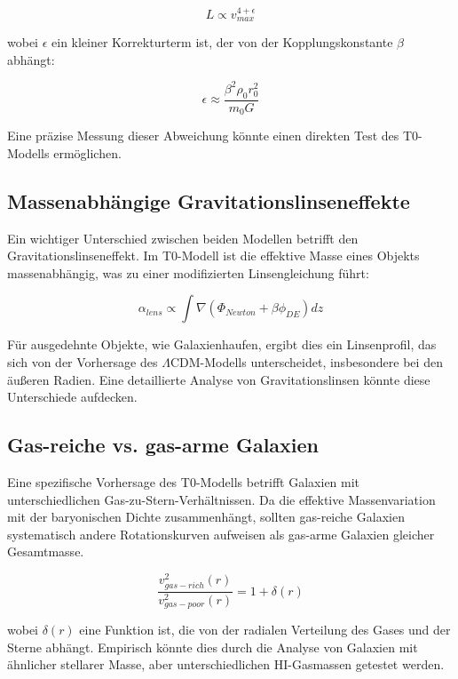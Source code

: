\documentclass[a4paper,12pt]{article}
\begin{document}
	\begin{equation}
		L \propto v_{max}^{4+\epsilon}
	\end{equation}
	
	wobei $\epsilon$ ein kleiner Korrekturterm ist, der von der Kopplungskonstante $\beta$ abhängt:
	
	\begin{equation}
		\epsilon \approx \frac{\beta^2 \rho_0 r_0^2}{m_0 G}
	\end{equation}
	
	Eine präzise Messung dieser Abweichung könnte einen direkten Test des T0-Modells ermöglichen.
	
	\subsection{Massenabhängige Gravitationslinseneffekte}
	
	Ein wichtiger Unterschied zwischen beiden Modellen betrifft den Gravitationslinseneffekt. Im T0-Modell ist die effektive Masse eines Objekts massenabhängig, was zu einer modifizierten Linsengleichung führt:
	
	\begin{equation}
		\alpha_{lens} \propto \int \nabla(\Phi_{Newton} + \beta\phi_{DE}) dz
	\end{equation}
	
	Für ausgedehnte Objekte, wie Galaxienhaufen, ergibt dies ein Linsenprofil, das sich von der Vorhersage des $\Lambda$CDM-Modells unterscheidet, insbesondere bei den äußeren Radien. Eine detaillierte Analyse von Gravitationslinsen könnte diese Unterschiede aufdecken.
	
	\subsection{Gas-reiche vs. gas-arme Galaxien}
	
	Eine spezifische Vorhersage des T0-Modells betrifft Galaxien mit unterschiedlichen Gas-zu-Stern-Verhältnissen. Da die effektive Massenvariation mit der baryonischen Dichte zusammenhängt, sollten gas-reiche Galaxien systematisch andere Rotationskurven aufweisen als gas-arme Galaxien gleicher Gesamtmasse.
	
	\begin{equation}
		\frac{v^2_{gas-rich}(r)}{v^2_{gas-poor}(r)} = 1 + \delta(r)
	\end{equation}
	
	wobei $\delta(r)$ eine Funktion ist, die von der radialen Verteilung des Gases und der Sterne abhängt. Empirisch könnte dies durch die Analyse von Galaxien mit ähnlicher stellarer Masse, aber unterschiedlichen HI-Gasmassen getestet werden.
	
\end{document}
